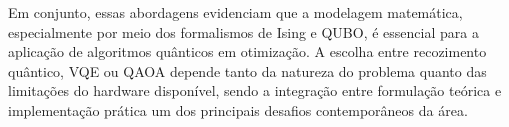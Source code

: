 Em conjunto, essas abordagens evidenciam que a modelagem matemática, especialmente por meio dos formalismos de Ising e QUBO, é essencial para a aplicação de algoritmos quânticos em otimização. A escolha entre recozimento quântico, VQE ou QAOA depende tanto da natureza do problema quanto das limitações do hardware disponível, sendo a integração entre formulação teórica e implementação prática um dos principais desafios contemporâneos da área.
